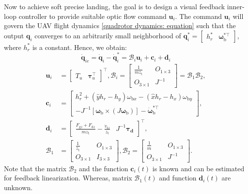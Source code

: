 \documentclass[lettersize,journal]{IEEEtran}
\begin{document}
Now to achieve soft precise landing, the goal is to design a visual feedback inner-loop controller to provide suitable optic flow command $\boldsymbol{u}_i$. The command $\boldsymbol{u}_i$ will govern
the UAV flight dynamics \eqref{quadrotor dynamics: equation} such that the output $\boldsymbol{q}_i$ converges to an arbitrarily small neighborhood of $\boldsymbol{q}_i^* = \begin{bmatrix} h_r^* & \boldsymbol{\omega}_{\text{b}}^{*\top} \end{bmatrix}$, where $h_r^*$ is a constant. Hence, we obtain:
\begin{equation} \label{perturbed system dynamics for inner loop: equation}
    \dot{\boldsymbol{q}}_{ie} = \dot{\boldsymbol{q}}_i - \dot{\boldsymbol{q}}_i^* = \mathcal{B}_i \boldsymbol{u}_i + \boldsymbol{c}_i + \boldsymbol{d}_i
\end{equation}
\begin{align*}
    \boldsymbol{u}_i &= \begin{bmatrix} T_{u} & \boldsymbol{\tau}_{u}^{\top} \end{bmatrix}^{\top}, 
    \mathcal{B}_i = \begin{bmatrix} \frac{1}{m z_{\text{t}}} & O_{1 \times 3} \\ O_{3 \times 1} & J^{-1} \end{bmatrix} = \mathcal{B}_{1} \mathcal{B}_{2}, \\
    \boldsymbol{c}_i &= \begin{bmatrix} h_r^2 + \left( \hat{y} h_r - h_y \right) \omega_{\text{b}x} - \left( \hat{x} h_r - h_x \right) \omega_{\text{b}y} \\ - J^{-1} \left[ \boldsymbol{\omega}_{\text{b}} \times (J \boldsymbol{\omega}_{\text{b}}) \right] - \dot{\boldsymbol{\omega}}_{\text{b}}^{*\top} \end{bmatrix}, \\
    \boldsymbol{d}_i &= \begin{bmatrix} \frac{F_{\text{g}z} + F_{\text{d}z}}{m z_{\text{t}}} - \frac{\dot{v}_{\text{t}z}}{z_{\text{t}}} & J^{-1} \boldsymbol{\tau_{\text{d}}} \end{bmatrix}^{\top}, \\
    \mathcal{B}_{1} &= \begin{bmatrix} \frac{1}{z_{\text{t}}} & O_{1 \times 3} \\ O_{3 \times 1} & I_{3 \times 3} \end{bmatrix}, \mathcal{B}_{2} = \begin{bmatrix} \frac{1}{m} & O_{1 \times 3} \\ O_{3 \times 1} & J^{-1} \end{bmatrix}.
\end{align*}
Note that the matrix $\mathcal{B}_{2}$ and the function $\boldsymbol{c}_i(t)$ is known and can be estimated for feedback linearization. Whereas, matrix $\mathcal{B}_{1}(t)$ and function $\boldsymbol{d}_i(t)$ are unknown.
\end{document}
